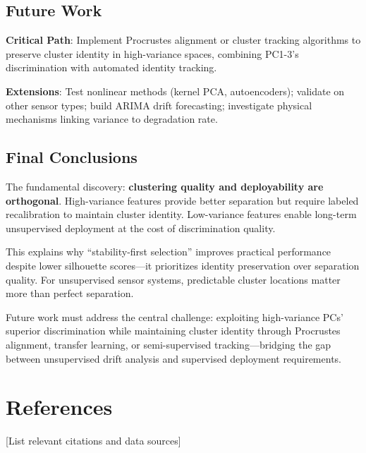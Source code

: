 \documentclass[
  letterpaper,
  DIV=11,
  numbers=noendperiod]{scrartcl}
\begin{document}
\subsection{Future Work}\label{future-work}

\textbf{Critical Path}: Implement Procrustes alignment or cluster
tracking algorithms to preserve cluster identity in high-variance
spaces, combining PC1-3's discrimination with automated identity
tracking.

\textbf{Extensions}: Test nonlinear methods (kernel PCA, autoencoders);
validate on other sensor types; build ARIMA drift forecasting;
investigate physical mechanisms linking variance to degradation rate.

\subsection{Final Conclusions}\label{final-conclusions}

The fundamental discovery: \textbf{clustering quality and deployability
are orthogonal}. High-variance features provide better separation but
require labeled recalibration to maintain cluster identity. Low-variance
features enable long-term unsupervised deployment at the cost of
discrimination quality.

This explains why ``stability-first selection'' improves practical
performance despite lower silhouette scores---it prioritizes identity
preservation over separation quality. For unsupervised sensor systems,
predictable cluster locations matter more than perfect separation.

Future work must address the central challenge: exploiting high-variance
PCs' superior discrimination while maintaining cluster identity through
Procrustes alignment, transfer learning, or semi-supervised
tracking---bridging the gap between unsupervised drift analysis and
supervised deployment requirements.

\section{References}\label{references}

{[}List relevant citations and data sources{]}
\end{document}
